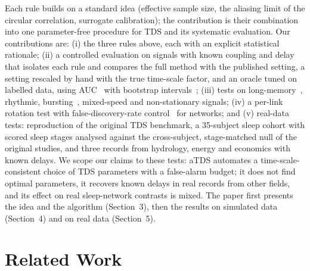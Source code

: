 \documentclass[11pt,a4paper]{article}
\begin{document}
Each rule builds on a standard idea (effective sample size, the aliasing limit of the circular correlation, surrogate calibration); the contribution is their combination into one parameter-free procedure for TDS and its systematic evaluation. Our contributions are: (i) the three rules above, each with an explicit statistical rationale; (ii) a controlled evaluation on signals with known coupling and delay that isolates each rule and compares the full method with the published setting, a setting rescaled by hand with the true time-scale factor, and an oracle tuned on labelled data, using AUC~\cite{Hanley1982MeaningUse} with bootstrap intervals~\cite{Efron1979BootstrapMethods}; (iii) tests on long-memory~\cite{Peng1995QuantificationScaling}, rhythmic, bursting~\cite{Rulkov2002ModelingSpikingbursting}, mixed-speed and non-stationary signals; (iv) a per-link rotation test with false-discovery-rate control~\cite{Benjamini1995ControllingFalse} for networks; and (v) real-data tests: reproduction of the original TDS benchmark, a 35-subject sleep cohort with scored sleep stages analysed against the cross-subject, stage-matched null of the original studies, and three records from hydrology, energy and economics with known delays. We scope our claims to these tests: aTDS automates a time-scale-consistent choice of TDS parameters with a false-alarm budget; it does not find optimal parameters, it recovers known delays in real records from other fields, and its effect on real sleep-network contrasts is mixed. The paper first presents the idea and the algorithm (Section~3), then the results on simulated data (Section~4) and on real data (Section~5).

\section{Related Work}
\label{sec:related_work}
\end{document}
